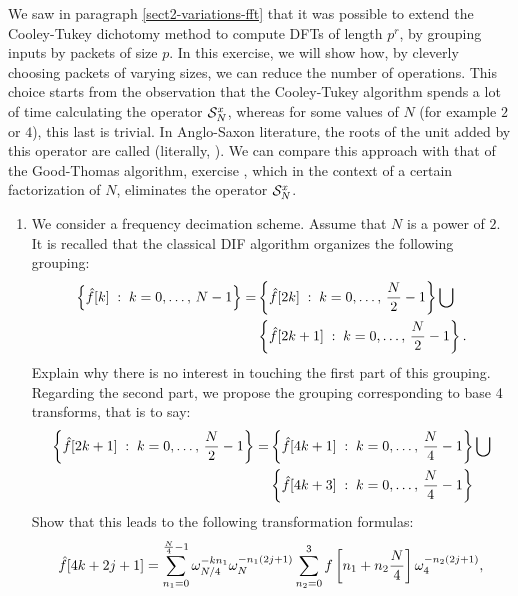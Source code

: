  
\begin{exo}
\label{exo-algo-split-radix}
 
    We saw in paragraph \ref{sect2-variations-fft} that it was possible to extend the Cooley-Tukey dichotomy method to compute DFTs of length $ p^r $, by grouping inputs by packets of size $ p $. In this exercise, we will show how, by cleverly choosing packets of varying sizes, we can reduce the number of operations. This choice starts from the observation that the Cooley-Tukey algorithm spends a lot of time calculating the operator $ \mathcal{S}_N^x $, whereas for some values of $N$ (for example $ 2 $ or $ 4 $), this last is trivial. In Anglo-Saxon literature, the roots of the unit added by this operator are called  (literally, ). We can compare this approach with that of the Good-Thomas algorithm, exercise , which in the context of a certain factorization of $N$, eliminates the operator $ \mathcal{S}_N^x $. \begin{enumerate}
\item We consider a frequency decimation scheme. Assume that $N$ is a power of $ 2 $. It is recalled that the classical DIF algorithm organizes the following grouping:
\begin{align*}
\left\{ \hat{f}[k] \;:\; k = 0, \ldots, \, N-1 \right\} = & \left\{ \hat{f}[2 k] \;:\; k = 0, \ldots, \, \frac{N}{2}-1 \right\} \bigcup \\
& \left\{ \hat{f}[2 k + 1] \;:\; k = 0, \ldots, \, \frac{N}{2}-1 \right\}.
\end{align*}
Explain why there is no interest in touching the first part of this grouping. Regarding the second part, we propose the grouping corresponding to base 4 transforms, that is to say:
\begin{align*}
\left\{ \hat{f}[2 k + 1] \;:\; k = 0, \ldots, \, \frac{N}{2}-1 \right\} = & \left\{ \hat{f}[4 k + 1] \;:\; k = 0, \ldots, \, \frac{N}{4}-1 \right\} \bigcup \\
& \left\{ \hat{f}[4 k + 3] \;:\; k = 0, \ldots, \, \frac{N}{4} -1 \right\}
\end{align*}
Show that this leads to the following transformation formulas:
\begin{equation*}
\hat{f}[4k + 2j + 1] = \sum_{n_1 = 0}^{\frac{N}{4} -1}{\omega_{N / 4}^{- k n_1} \omega_N^{-n_1 (2j + 1)} \sum_{n_2 = 0}^{3}{f \left[n_1 + n_2 \frac{N}{4} \right] \omega_4^{- n_2 (2j + 1) }}},
\end{equation*}

\end{enumerate}
\end{exo}
